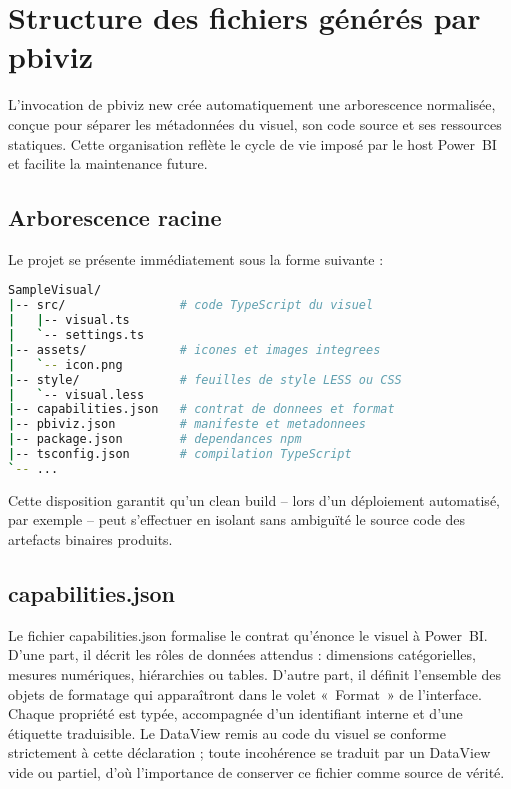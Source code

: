 
\section{Structure des fichiers générés par pbiviz}\label{sec:ch4_files_structure}

L’invocation de pbiviz new crée automatiquement une arborescence normalisée, conçue pour séparer les métadonnées du visuel, son code source et ses ressources statiques. Cette organisation reflète le cycle de vie imposé par le host Power BI et facilite la maintenance future.

\subsection{Arborescence racine}

Le projet se présente immédiatement sous la forme suivante :
\begin{lstlisting}[language=bash]
SampleVisual/
|-- src/                # code TypeScript du visuel
|   |-- visual.ts
|   `-- settings.ts
|-- assets/             # icones et images integrees
|   `-- icon.png
|-- style/              # feuilles de style LESS ou CSS
|   `-- visual.less
|-- capabilities.json   # contrat de donnees et format
|-- pbiviz.json         # manifeste et metadonnees
|-- package.json        # dependances npm
|-- tsconfig.json       # compilation TypeScript
`-- ...
\end{lstlisting}
Cette disposition garantit qu’un clean build -- lors d’un déploiement automatisé, par exemple -- peut s’effectuer en isolant sans ambiguïté le source code des artefacts binaires produits.

\subsection{capabilities.json}

Le fichier capabilities.json formalise le contrat qu’énonce le visuel à Power BI. D’une part, il décrit les rôles de données attendus : dimensions catégorielles, mesures numériques, hiérarchies ou tables. D’autre part, il définit l’ensemble des objets de formatage qui apparaîtront dans le volet « Format » de l’interface. Chaque propriété est typée, accompagnée d’un identifiant interne et d’une étiquette traduisible. Le DataView remis au code du visuel se conforme strictement à cette déclaration ; toute incohérence se traduit par un DataView vide ou partiel, d’où l’importance de conserver ce fichier comme source de vérité.

